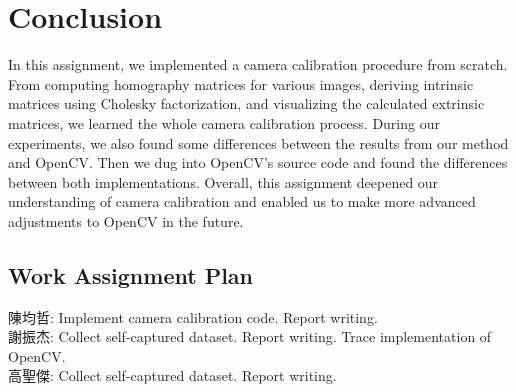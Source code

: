 \documentclass[12pt,letterpaper]{article}
\begin{document}
\section{Conclusion}
In this assignment, we implemented a camera calibration procedure from scratch. From computing homography matrices for various images, deriving intrinsic matrices using Cholesky factorization, and visualizing the calculated extrinsic matrices, we learned the whole camera calibration process. During our experiments, we also found some differences between the results from our method and OpenCV. Then we dug into OpenCV's source code and found the differences between both implementations.
Overall, this assignment deepened our understanding of camera calibration and enabled us to make more advanced adjustments to OpenCV in the future.
\begin{CJK}{UTF8}{bkai}
    \section{Work Assignment Plan}
    \noindent
    陳均哲: Implement camera calibration code. Report writing.\\
    謝振杰: Collect self-captured dataset. Report writing. Trace implementation of OpenCV.\\
    高聖傑: Collect self-captured dataset. Report writing.
\end{CJK}

% 
% 
\end{document}
